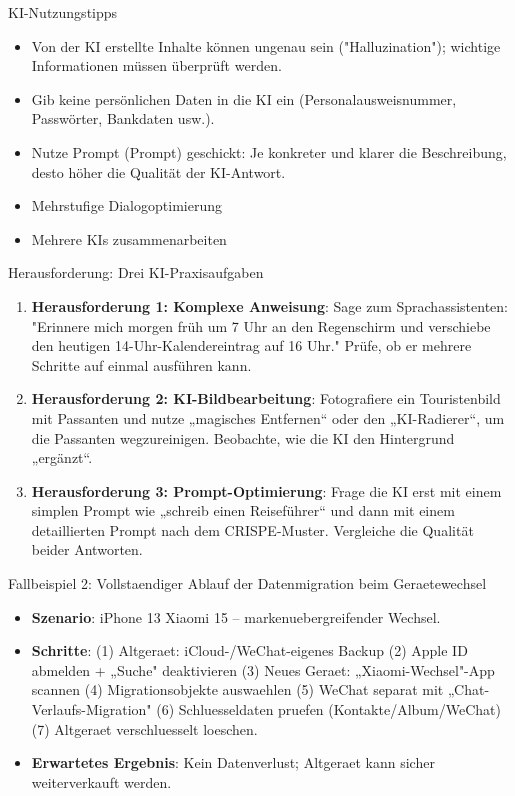 \begin{tcbinfo}{KI-Nutzungstipps}
\begin{itemize}
  \item Von der KI erstellte Inhalte können ungenau sein ("Halluzination"); wichtige Informationen müssen überprüft werden.
  \item Gib keine persönlichen Daten in die KI ein (Personalausweisnummer, Passwörter, Bankdaten usw.).
  \item Nutze Prompt (Prompt) geschickt: Je konkreter und klarer die Beschreibung, desto höher die Qualität der KI-Antwort.
  \item Mehrstufige Dialogoptimierung
  \item Mehrere KIs zusammenarbeiten
\end{itemize}

\end{tcbinfo}

\begin{tcbpractice}{Herausforderung: Drei KI-Praxisaufgaben}
\begin{enumerate}
  \item \textbf{Herausforderung 1: Komplexe Anweisung}: Sage zum Sprachassistenten: "Erinnere mich morgen früh um 7 Uhr an den Regenschirm und verschiebe den heutigen 14-Uhr-Kalendereintrag auf 16 Uhr." Prüfe, ob er mehrere Schritte auf einmal ausführen kann.
  \item \textbf{Herausforderung 2: KI-Bildbearbeitung}: Fotografiere ein Touristenbild mit Passanten und nutze „magisches Entfernen“ oder den „KI-Radierer“, um die Passanten wegzureinigen. Beobachte, wie die KI den Hintergrund „ergänzt“.
  \item \textbf{Herausforderung 3: Prompt-Optimierung}: Frage die KI erst mit einem simplen Prompt wie „schreib einen Reiseführer“ und dann mit einem detaillierten Prompt nach dem CRISPE-Muster. Vergleiche die Qualität beider Antworten.
\end{enumerate}

\end{tcbpractice}

\begin{tcbinfo}{Fallbeispiel 2: Vollstaendiger Ablauf der Datenmigration beim Geraetewechsel}
\begin{itemize}
  \item \textbf{Szenario}: iPhone 13 Xiaomi 15 – markenuebergreifender Wechsel.
  \item \textbf{Schritte}: (1) Altgeraet: iCloud-/WeChat-eigenes Backup (2) Apple ID abmelden + „Suche" deaktivieren (3) Neues Geraet: „Xiaomi-Wechsel"-App scannen (4) Migrationsobjekte auswaehlen (5) WeChat separat mit „Chat-Verlaufs-Migration" (6) Schluesseldaten pruefen (Kontakte/Album/WeChat) (7) Altgeraet verschluesselt loeschen.
  \item \textbf{Erwartetes Ergebnis}: Kein Datenverlust; Altgeraet kann sicher weiterverkauft werden.
\end{itemize}

\end{tcbinfo}
